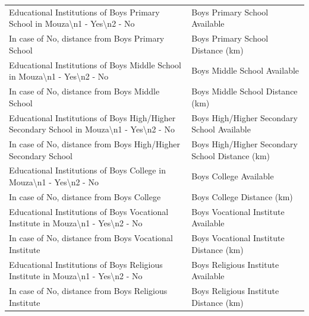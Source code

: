 \documentclass[10pt,a4paper]{article}
\begin{document}
\begin{longtable}{>{\raggedright\arraybackslash}p{7.5cm} >{\raggedright\arraybackslash}p{7.5cm}}
Educational Institutions of Boys Primary School in Mouza\textbackslash n1 - Yes\textbackslash n2 - No & Boys Primary School Available \\
In case of No, distance from Boys Primary School & Boys Primary School Distance (km) \\
Educational Institutions of Boys Middle School in Mouza\textbackslash n1 - Yes\textbackslash n2 - No & Boys Middle School Available \\
In case of No, distance from Boys Middle School & Boys Middle School Distance (km) \\
Educational Institutions of Boys High/Higher Secondary School in Mouza\textbackslash n1 - Yes\textbackslash n2 - No & Boys High/Higher Secondary School Available \\
In case of No, distance from Boys High/Higher Secondary School & Boys High/Higher Secondary School Distance (km) \\
Educational Institutions of Boys College in Mouza\textbackslash n1 - Yes\textbackslash n2 - No & Boys College Available \\
In case of No, distance from Boys College & Boys College Distance (km) \\
Educational Institutions of Boys Vocational Institute in Mouza\textbackslash n1 - Yes\textbackslash n2 - No & Boys Vocational Institute Available \\
In case of No, distance from Boys Vocational Institute & Boys Vocational Institute Distance (km) \\
Educational Institutions of Boys Religious Institute in Mouza\textbackslash n1 - Yes\textbackslash n2 - No & Boys Religious Institute Available \\
In case of No, distance from Boys Religious Institute & Boys Religious Institute Distance (km) \\


\end{longtable}
\end{document}
